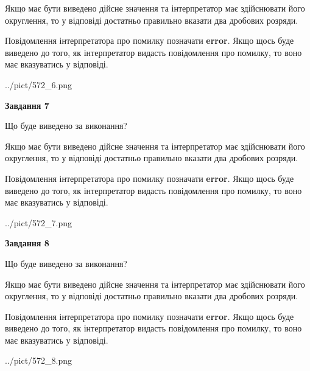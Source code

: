 \documentclass[12pt, ukrainian]{article}
\begin{document}
{\begin {Large}
Якщо має бути виведено дійсне значення та інтерпретатор має здійснювати його округлення, 
то у відповіді достатньо правильно вказати два дробових розряди.

Повідомлення інтерпретатора про помилку позначати \textbf{error}.
Якщо щось буде виведено до того, як інтерпретатор видасть повідомлення про помилку, 
то воно має вказуватись у відповіді. \par

\begin{center}
	{../pict/572_6.png}
\end{center}
\newpage

{\begin {center}\textbf{Завдання 7}\end {center}}\par
Що буде виведено за виконання? \par

Якщо має бути виведено дійсне значення та інтерпретатор має здійснювати його округлення, 
то у відповіді достатньо правильно вказати два дробових розряди.

Повідомлення інтерпретатора про помилку позначати \textbf{error}.
Якщо щось буде виведено до того, як інтерпретатор видасть повідомлення про помилку, 
то воно має вказуватись у відповіді. \par

\begin{center}
	{../pict/572_7.png}
\end{center}
\newpage

{\begin {center}\textbf{Завдання 8}\end {center}}\par
Що буде виведено за виконання? \par

Якщо має бути виведено дійсне значення та інтерпретатор має здійснювати його округлення, 
то у відповіді достатньо правильно вказати два дробових розряди.

Повідомлення інтерпретатора про помилку позначати \textbf{error}.
Якщо щось буде виведено до того, як інтерпретатор видасть повідомлення про помилку, 
то воно має вказуватись у відповіді. \par

\begin{center}
	{../pict/572_8.png}
\end{center}
\newpage


\end{Large}}
\end{document}
